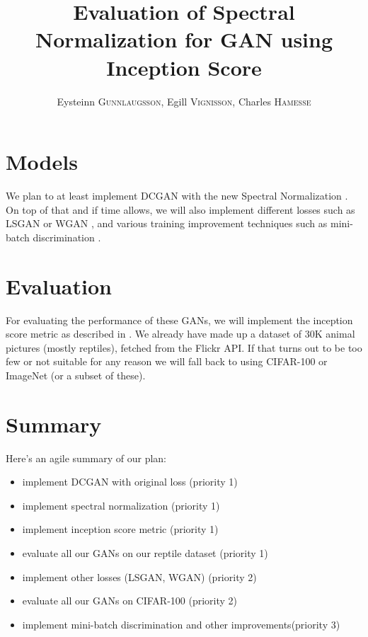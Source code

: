 \documentclass[a4paper]{article}
\title{Evaluation of Spectral Normalization for GAN using Inception Score}
\author{
	Eysteinn \textsc{Gunnlaugsson},
	Egill \textsc{Vignisson},
	Charles \textsc{Hamesse}
}
\begin{document}
\maketitle

 
 
\section{Models} 
We plan to at least implement DCGAN \cite{DBLP:journals/corr/RadfordMC15} with the new Spectral Normalization \cite{miyato2018spectral}. On top of that and if time allows, we will also implement different losses such as LSGAN \cite{mao2017least} or WGAN \cite{arjovsky2017wasserstein}, and various training improvement techniques such as mini-batch discrimination \cite{salimans2016improved}. 

\section{Evaluation} 
For evaluating the performance of these GANs, we will implement the inception score metric as described in \cite{salimans2016improved}. We already have made up a dataset of 30K animal pictures (mostly reptiles), fetched from the Flickr API. If that turns out to be too few or not suitable for any reason we will fall back to using CIFAR-100 or ImageNet (or a subset of these).  

\section{Summary}
Here's an agile summary of our plan: 
\begin{itemize}
	\item implement DCGAN with original loss (priority 1)
	\item implement spectral normalization (priority 1)
	\item implement inception score metric (priority 1)
	\item evaluate all our GANs on our reptile dataset (priority 1)
	\item implement other losses (LSGAN, WGAN) (priority 2)
	\item evaluate all our GANs on CIFAR-100 (priority 2)
	\item implement mini-batch discrimination and other improvements(priority 3)
\end{itemize}


\end{document}
